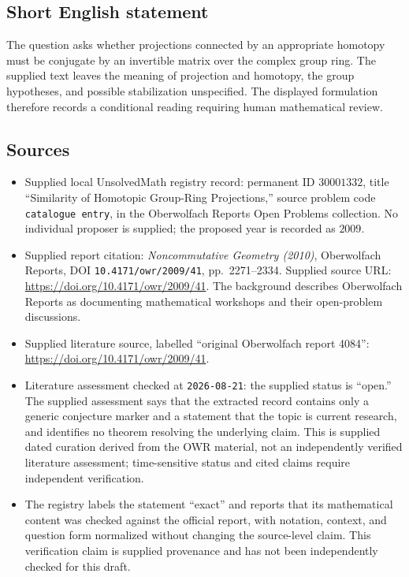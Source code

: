 \documentclass[11pt]{article}
\begin{document}
\subsection{Short English statement}
The question asks whether projections connected by an appropriate homotopy must be conjugate by an invertible matrix over the complex group ring. The supplied text leaves the meaning of projection and homotopy, the group hypotheses, and possible stabilization unspecified. The displayed formulation therefore records a conditional reading requiring human mathematical review.
\subsection{Sources}
\begin{itemize}
\item Supplied local UnsolvedMath registry record: permanent ID \(30001332\), title ``Similarity of Homotopic Group-Ring Projections,'' source problem code \texttt{catalogue entry}, in the Oberwolfach Reports Open Problems collection. No individual proposer is supplied; the proposed year is recorded as \(2009\).
\item Supplied report citation: \emph{Noncommutative Geometry (2010)}, Oberwolfach Reports, DOI \texttt{10.4171/owr/2009/41}, pp.\ 2271--2334. Supplied source URL: \url{https://doi.org/10.4171/owr/2009/41}. The background describes Oberwolfach Reports as documenting mathematical workshops and their open-problem discussions.
\item Supplied literature source, labelled ``original Oberwolfach report 4084'': \url{https://doi.org/10.4171/owr/2009/41}.
\item Literature assessment checked at \texttt{2026-08-21}: the supplied status is ``open.'' The supplied assessment says that the extracted record contains only a generic conjecture marker and a statement that the topic is current research, and identifies no theorem resolving the underlying claim. This is supplied dated curation derived from the OWR material, not an independently verified literature assessment; time-sensitive status and cited claims require independent verification.
\item The registry labels the statement ``exact'' and reports that its mathematical content was checked against the official report, with notation, context, and question form normalized without changing the source-level claim. This verification claim is supplied provenance and has not been independently checked for this draft.
\end{itemize}
\end{document}
